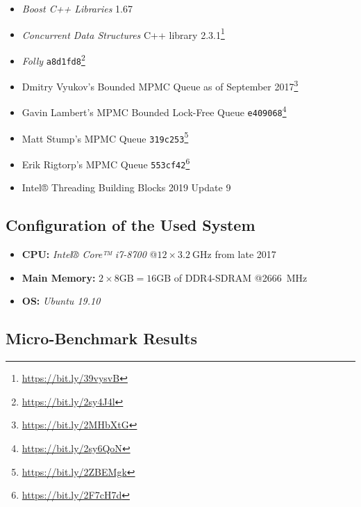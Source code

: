 \begin{@empty}
	\begin{itemize}
		\itemsep0em
		\item	\textit{Boost C++ Libraries} 1.67
		\item	\textit{Concurrent Data Structures} C++ library 2.3.1\footnote{\url{https://bit.ly/39vysvB}}
		\item	\textit{Folly} \texttt{a8d1fd8}\footnote{\url{https://bit.ly/2sy4J4l}}
		\item	Dmitry Vyukov's Bounded MPMC Queue as of September 2017\footnote{\url{https://bit.ly/2MHbXtG}}
		\item	Gavin Lambert's MPMC Bounded Lock-Free Queue \texttt{e409068}\footnote{\url{https://bit.ly/2sy6QoN}}
		\item	Matt Stump's MPMC Queue \texttt{319c253}\footnote{\url{https://bit.ly/2ZBEMgk}}
		\item	Erik Rigtorp's MPMC Queue \texttt{553cf42}\footnote{\url{https://bit.ly/2F7cH7d}}
		\item	Intel® Threading Building Blocks 2019 Update 9
	\end{itemize}
\end{@empty}

\subsection[System Configuration]{Configuration of the Used System} \label{subsec:free-list-system-configuration}

\begin{@empty}
	\begin{itemize}
		\itemsep0em
		\item	\textbf{CPU:} \emph{Intel® Core™ i7-8700} @$12 \times \SI{3.2}{\giga\hertz}$ from late 2017
		\item	\textbf{Main Memory:} $2 \times 8\text{GB} = 16\text{GB}$ of DDR4-SDRAM @\SI{2666}{\mega\hertz}
		\item	\textbf{OS:} \emph{Ubuntu 19.10}
	\end{itemize}
\end{@empty}

\subsection[Micro-Benchmark Results]{Micro-Benchmark Results} \label{subsec:free-list-results}

